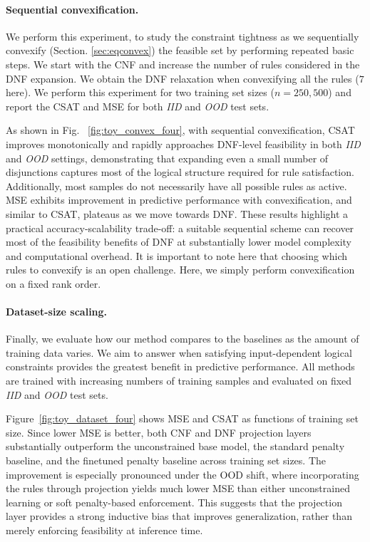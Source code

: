 \documentclass{article}
\theoremstyle{plain}
\theoremstyle{definition}
\theoremstyle{remark}
\begin{document}
\paragraph{Sequential convexification.}
We perform this experiment, to study the constraint tightness as we sequentially convexify (Section. \ref{sec:eqconvex}) the feasible set by performing repeated basic steps. We start with the CNF and increase the number of rules considered in the DNF expansion. We obtain the DNF relaxation when convexifying all the rules ($7$ here). We perform this experiment for two training set sizes ($n=250, 500$) and report the CSAT and MSE for both \emph{IID} and \emph{OOD} test sets.

As shown in Fig. ~\ref{fig:toy_convex_four}, with sequential convexification, CSAT improves monotonically and rapidly approaches DNF-level feasibility in both \emph{IID} and \emph{OOD} settings, demonstrating that expanding even a small number of disjunctions captures most of the logical structure required for rule satisfaction. Additionally, most samples do not necessarily have all possible rules as active. 
MSE exhibits improvement in predictive performance with convexification, and similar to CSAT, plateaus as we move towards DNF. These results highlight a practical accuracy-scalability trade-off: a suitable sequential scheme can recover most of the feasibility benefits of DNF at substantially lower model complexity and computational overhead. It is important to note here that choosing which rules to convexify is an open challenge. Here, we simply perform convexification on a fixed rank order.


\paragraph{Dataset-size scaling.}
Finally, we evaluate how our method compares to the baselines as the amount of training data varies. We aim to answer when satisfying input-dependent logical constraints provides the greatest benefit in predictive performance. All methods are trained with increasing numbers of training samples and evaluated on fixed \emph{IID} and \emph{OOD} test sets.

Figure~\ref{fig:toy_dataset_four} shows MSE and CSAT as functions of training set size. Since lower MSE is better, both CNF and DNF projection layers substantially outperform the unconstrained base model, the standard penalty baseline, and the finetuned penalty baseline across training set sizes. The improvement is especially pronounced under the OOD shift, where incorporating the rules through projection yields much lower MSE than either unconstrained learning or soft penalty-based enforcement. This suggests that the projection layer provides a strong inductive bias that improves generalization, rather than merely enforcing feasibility at inference time.
\end{document}
